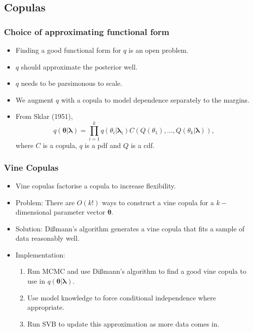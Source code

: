 \documentclass{beamer}\usepackage[]{graphicx}\usepackage[]{color}
\begin{document}
\begin{frame}
\section{Copulas}
\frametitle{Choice of approximating functional form}
\begin{itemize}
\item Finding a good functional form for $q$ is an open problem.
\item $q$ should approximate the posterior well.
\item $q$ needs to be parsimonous to scale.
\item We augment $q$ with a copula to model dependence separately to the margins.
\item From Sklar (1951), 
\begin{equation}
q(\boldsymbol{\theta} | \boldsymbol{\lambda}) = \prod_{i = 1}^{k} q(\theta_i | \boldsymbol{\lambda}_i) C(Q(\theta_1), \dots, Q(\theta_k | \boldsymbol{\lambda})),
\end{equation}
where $C$ is a copula, $q$ is a pdf and $Q$ is a cdf.
\end{itemize}
\end{frame}


\begin{frame}
\frametitle{Vine Copulas}
\begin{itemize}
\item Vine copulas factorise a copula to increase flexibility.
\vspace{3mm}
\item Problem: There are $O(k!)$ ways to construct a vine copula for a $k-$dimensional parameter vector $\boldsymbol{\theta}$.
\item Solution: Di{\ss}mann's algorithm generates a vine copula that fits a sample of data reasonably well.
\item Implementation: 
\begin{enumerate}
\item Run MCMC and use Di{\ss}mann's algorithm to find a good vine copula to use in $q(\boldsymbol{\theta} | \boldsymbol{\lambda})$. 
\item Use model knowledge to force conditional independence where appropriate.
\item Run SVB to update this approximation as more data comes in.
\end{enumerate}
\end{itemize}
\end{frame}
\end{document}
